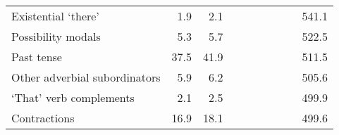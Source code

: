 \begin{table}[!t]
\begin{tabular*}{\linewidth}{@{\extracolsep{\fill}}lrrrrrrrrr}
Existential ‘there’ & 1.9 & 2.1 & {\cellcolor[HTML]{F4A582}{\textcolor[HTML]{000000}{59\%}}} & {\cellcolor[HTML]{F4A582}{\textcolor[HTML]{000000}{71\%}}} & {\cellcolor[HTML]{D6604D}{\textcolor[HTML]{FFFFFF}{42\%}}} & {\cellcolor[HTML]{D6604D}{\textcolor[HTML]{FFFFFF}{42\%}}} & {\cellcolor[HTML]{F7F7F7}{\textcolor[HTML]{000000}{108\%}}} & {\cellcolor[HTML]{F7F7F7}{\textcolor[HTML]{000000}{109\%}}} & 541.1 \\ 
Possibility modals & 5.3 & 5.7 & {\cellcolor[HTML]{92C5DE}{\textcolor[HTML]{000000}{144\%}}} & {\cellcolor[HTML]{F7F7F7}{\textcolor[HTML]{000000}{104\%}}} & {\cellcolor[HTML]{F7F7F7}{\textcolor[HTML]{000000}{111\%}}} & {\cellcolor[HTML]{D1E5F0}{\textcolor[HTML]{000000}{116\%}}} & {\cellcolor[HTML]{F7F7F7}{\textcolor[HTML]{000000}{99\%}}} & {\cellcolor[HTML]{F7F7F7}{\textcolor[HTML]{000000}{99\%}}} & 522.5 \\ 
Past tense & 37.5 & 41.9 & {\cellcolor[HTML]{FDDBC7}{\textcolor[HTML]{000000}{77\%}}} & {\cellcolor[HTML]{FDDBC7}{\textcolor[HTML]{000000}{83\%}}} & {\cellcolor[HTML]{F7F7F7}{\textcolor[HTML]{000000}{91\%}}} & {\cellcolor[HTML]{FDDBC7}{\textcolor[HTML]{000000}{83\%}}} & {\cellcolor[HTML]{D1E5F0}{\textcolor[HTML]{000000}{115\%}}} & {\cellcolor[HTML]{F7F7F7}{\textcolor[HTML]{000000}{111\%}}} & 511.5 \\ 
Other adverbial subordinators & 5.9 & 6.2 & {\cellcolor[HTML]{92C5DE}{\textcolor[HTML]{000000}{136\%}}} & {\cellcolor[HTML]{D1E5F0}{\textcolor[HTML]{000000}{118\%}}} & {\cellcolor[HTML]{D1E5F0}{\textcolor[HTML]{000000}{114\%}}} & {\cellcolor[HTML]{F7F7F7}{\textcolor[HTML]{000000}{107\%}}} & {\cellcolor[HTML]{FDDBC7}{\textcolor[HTML]{000000}{82\%}}} & {\cellcolor[HTML]{FDDBC7}{\textcolor[HTML]{000000}{89\%}}} & 505.6 \\ 
‘That’ verb complements & 2.1 & 2.5 & {\cellcolor[HTML]{F4A582}{\textcolor[HTML]{000000}{70\%}}} & {\cellcolor[HTML]{F4A582}{\textcolor[HTML]{000000}{55\%}}} & {\cellcolor[HTML]{92C5DE}{\textcolor[HTML]{000000}{144\%}}} & {\cellcolor[HTML]{D1E5F0}{\textcolor[HTML]{000000}{114\%}}} & {\cellcolor[HTML]{92C5DE}{\textcolor[HTML]{000000}{159\%}}} & {\cellcolor[HTML]{92C5DE}{\textcolor[HTML]{000000}{147\%}}} & 499.9 \\ 
Contractions & 16.9 & 18.1 & {\cellcolor[HTML]{F4A582}{\textcolor[HTML]{000000}{63\%}}} & {\cellcolor[HTML]{F4A582}{\textcolor[HTML]{000000}{60\%}}} & {\cellcolor[HTML]{92C5DE}{\textcolor[HTML]{000000}{141\%}}} & {\cellcolor[HTML]{92C5DE}{\textcolor[HTML]{000000}{139\%}}} & {\cellcolor[HTML]{92C5DE}{\textcolor[HTML]{000000}{142\%}}} & {\cellcolor[HTML]{D1E5F0}{\textcolor[HTML]{000000}{129\%}}} & 499.6 \\ 

\end{tabular*}
\end{table}
